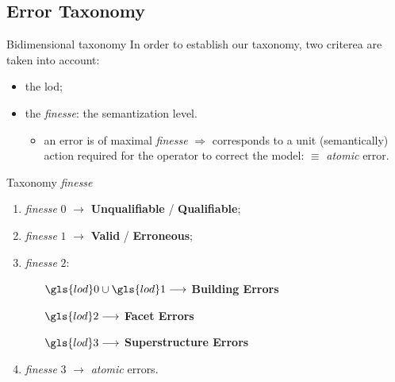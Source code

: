 \documentclass{beamer}
\begin{document}
        \subsection{Error Taxonomy}
            \begin{frame}{Bidimensional taxonomy}
                In order to establish our taxonomy, two criterea are taken into account:
                \begin{itemize}[label=$\blacktriangleright$, font=\color{IGNGreen}]
                    \item<1-> the \acrfull{lod};
                    \item<2-> the \emph{finesse}: the semantization level.
                    \begin{itemize}
                        \item<3-> an error is of maximal \emph{finesse} $\Rightarrow$ corresponds to a unit (semantically) action required for the operator to correct the model: $\equiv$ \emph{atomic} error.
                    \end{itemize}
                \end{itemize}
            \end{frame}
            \begin{frame}{Taxonomy \emph{finesse}}
                \begin{enumerate}[label = (\roman*)., font=\color{IGNGreen}]
                    \item<1-> \emph{finesse} $0$ $\longrightarrow$ \textbf{Unqualifiable} / \textbf{Qualifiable};
                    \item<2-> \emph{finesse} $1$ $\longrightarrow$ \textbf{Valid} / \textbf{Erroneous};
                    \item<3-> \emph{finesse} $2$:
                    \begin{itemize}[leftmargin=12em, font=\color{IGNDarkOrange}]
                        \item[$\gls{lod}0 \cup \gls{lod}1 \longrightarrow$] \textbf{Building Errors}
                        \item[$\gls{lod}2 \longrightarrow$] \textbf{Facet Errors}
                        \item[$\gls{lod}3 \longrightarrow$] \textbf{Superstructure Errors}
                    \end{itemize}
                    \item<4-> \emph{finesse} $3$ $\longrightarrow$ \emph{atomic} errors.
                \end{enumerate}
            \end{frame}
\end{document}
